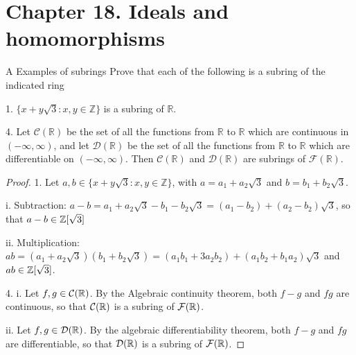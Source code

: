 \section*{Chapter 18. Ideals and homomorphisms}


\begin{exercise}{A Examples of subrings}
  Prove that each of the following is a subring of the indicated ring

  1. $\{x+y\sqrt{3}:x,y\in\mathbb{Z}\}$ is a subring of $\mathbb{R}$.

  4. Let $\mathcal{C}(\mathbb{R})$ be the set of all the functions from $\mathbb{R}$ to $\mathbb{R}$ which are continuous in $(-\infty,\infty)$, and let $\mathcal{D}(\mathbb{R})$ be the set of all the functions from $\mathbb{R}$ to $\mathbb{R}$ which are differentiable on $(-\infty,\infty)$. Then $\mathcal{C}(\mathbb{R})$ and $\mathcal{D}(\mathbb{R})$ are subrings of $\mathcal{F}(\mathbb{R})$.
\end{exercise}
\begin{proof}
 1. Let $a, b\in \{x+y\sqrt{3}:x,y\in\mathbb{Z}\}$, with $a=a_{1}+a_{2}\sqrt{3}$ and $b=b_{1}+b_{2}\sqrt{3}$.
  
  i. Subtraction: $a-b=a_{1}+a_{2}\sqrt{3}-b_{1}-b_{2}\sqrt{3} =(a_{1}-b_{2})+(a_{2}-b_{2})\sqrt{3}$, so that $a-b\in \mathbb{Z}[\sqrt{3}]$
  
  ii. Multiplication: $ab= (a_{1}+a_{2}\sqrt{3})(b_{1}+b_{2}\sqrt{3})= (a_{1}b_{1}+3a_{2}b_{2})+(a_{1}b_{2}+b_{1}a_{2})\sqrt{3}$ and $ab\in\mathbb{Z}[\sqrt{3}]$.

 4. i. Let $f,g\in\mathcal{C}(\mathbb{R})$. By the Algebraic continuity theorem, both $f-g$ and $fg$ are continuous, so that $\mathcal{C}(\mathbb{R})$ is a subring of $\mathcal{F}(\mathbb{R})$.
 
 ii. Let $f,g\in\mathcal{D}(\mathbb{R})$. By the algebraic differentiability theorem, both $f-g$ and $fg$ are differentiable, so that $\mathcal{D}(\mathbb{R})$ is a subring of $\mathcal{F}(\mathbb{R})$. 
\end{proof}


